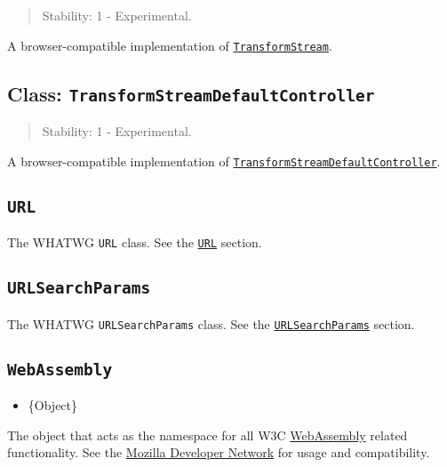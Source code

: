 \begin{quote}
Stability: 1 - Experimental.
\end{quote}

A browser-compatible implementation of
\href{webstreams.md\#class-transformstream}{\texttt{TransformStream}}.

\subsection{\texorpdfstring{Class:
\texttt{TransformStreamDefaultController}}{Class: TransformStreamDefaultController}}\label{class-transformstreamdefaultcontroller}

\begin{quote}
Stability: 1 - Experimental.
\end{quote}

A browser-compatible implementation of
\href{webstreams.md\#class-transformstreamdefaultcontroller}{\texttt{TransformStreamDefaultController}}.

\subsection{\texorpdfstring{\texttt{URL}}{URL}}\label{url}

The WHATWG \texttt{URL} class. See the
\href{url.md\#class-url}{\texttt{URL}} section.

\subsection{\texorpdfstring{\texttt{URLSearchParams}}{URLSearchParams}}\label{urlsearchparams}

The WHATWG \texttt{URLSearchParams} class. See the
\href{url.md\#class-urlsearchparams}{\texttt{URLSearchParams}} section.

\subsection{\texorpdfstring{\texttt{WebAssembly}}{WebAssembly}}\label{webassembly}

\begin{itemize}
\tightlist
\item
  \{Object\}
\end{itemize}

The object that acts as the namespace for all W3C
\href{https://webassembly.org}{WebAssembly} related functionality. See
the \href{https://developer.mozilla.org/en-US/docs/WebAssembly}{Mozilla
Developer Network} for usage and compatibility.

